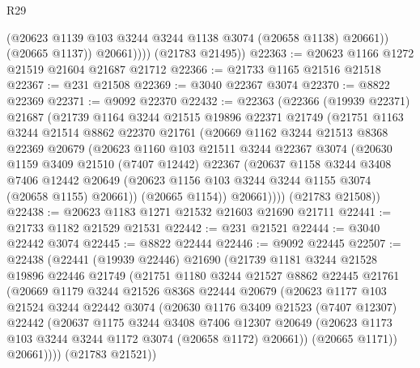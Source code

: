 \begin{lexlean}{R29}
\begin{coremodule}
                  (@20623 @1139 @103 @3244 @3244 @1138 @3074 (@20658 @1138) @20661))
                (@20665 @1137))
              @20661))))
      (@21783 @21495))
@22363 := @20623 @1166 @1272 @21519 @21604 @21687 @21712
@22366 := @21733 @1165 @21516 @21518
@22367 := @231 @21508
@22369 := @3040 @22367 @3074
@22370 := @8822 @22369
@22371 := @9092 @22370
@22432 := @22363
    (@22366
      (@19939 @22371)
      @21687
      (@21739
        @1164
        @3244
        @21515
        @19896
        @22371
        @21749
        (@21751
          @1163
          @3244
          @21514
          @8862
          @22370
          @21761
          (@20669
            @1162
            @3244
            @21513
            @8368
            @22369
            @20679
            (@20623
              @1160
              @103
              @21511
              @3244
              @22367
              @3074
              (@20630
                @1159
                @3409
                @21510
                (@7407 @12442)
                @22367
                (@20637
                  @1158
                  @3244
                  @3408
                  @7406
                  @12442
                  @20649
                  (@20623 @1156 @103 @3244 @3244 @1155 @3074 (@20658 @1155) @20661))
                (@20665 @1154))
              @20661))))
      (@21783 @21508))
@22438 := @20623 @1183 @1271 @21532 @21603 @21690 @21711
@22441 := @21733 @1182 @21529 @21531
@22442 := @231 @21521
@22444 := @3040 @22442 @3074
@22445 := @8822 @22444
@22446 := @9092 @22445
@22507 := @22438
    (@22441
      (@19939 @22446)
      @21690
      (@21739
        @1181
        @3244
        @21528
        @19896
        @22446
        @21749
        (@21751
          @1180
          @3244
          @21527
          @8862
          @22445
          @21761
          (@20669
            @1179
            @3244
            @21526
            @8368
            @22444
            @20679
            (@20623
              @1177
              @103
              @21524
              @3244
              @22442
              @3074
              (@20630
                @1176
                @3409
                @21523
                (@7407 @12307)
                @22442
                (@20637
                  @1175
                  @3244
                  @3408
                  @7406
                  @12307
                  @20649
                  (@20623 @1173 @103 @3244 @3244 @1172 @3074 (@20658 @1172) @20661))
                (@20665 @1171))
              @20661))))
      (@21783 @21521))

\end{coremodule}
\end{lexlean}
